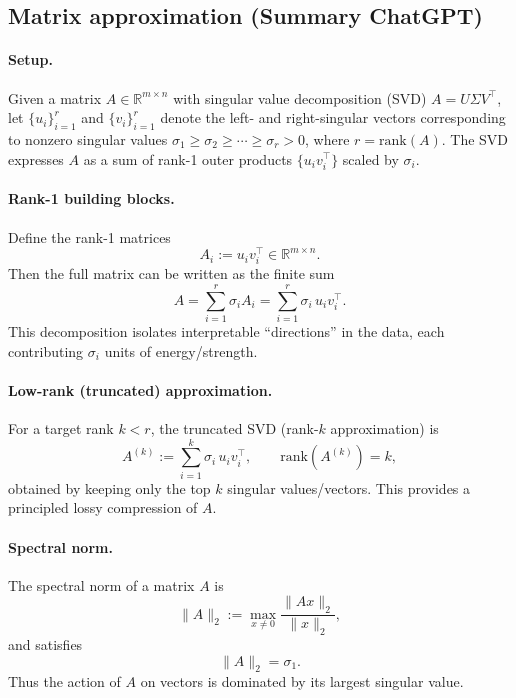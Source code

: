 \subsection{Matrix approximation (Summary ChatGPT)}

\paragraph{Setup.}
Given a matrix \(A \in \mathbb{R}^{m\times n}\) with singular value decomposition (SVD)
\(A = U\Sigma V^\top\),
let \(\{u_i\}_{i=1}^r\) and \(\{v_i\}_{i=1}^r\) denote the left- and right-singular vectors
corresponding to nonzero singular values \(\sigma_1 \ge \sigma_2 \ge \cdots \ge \sigma_r>0\),
where \(r=\mathrm{rank}(A)\). The SVD expresses \(A\) as a sum of rank-1 outer products \(\{u_iv_i^\top\}\) scaled by \(\sigma_i\). %

\paragraph{Rank-1 building blocks.}
Define the rank-1 matrices
\[
A_i := u_i v_i^\top \in \mathbb{R}^{m\times n}.
\]
Then the full matrix can be written as the finite sum
\[
A = \sum_{i=1}^r \sigma_i A_i
= \sum_{i=1}^r \sigma_i\, u_i v_i^\top.
\]
This decomposition isolates interpretable ``directions'' in the data, each contributing
\(\sigma_i\) units of energy/strength. %

\paragraph{Low-rank (truncated) approximation.}
For a target rank \(k<r\),
the truncated SVD (rank-\(k\) approximation) is
\[
A^{(k)} := \sum_{i=1}^k \sigma_i\, u_i v_i^\top,
\qquad \mathrm{rank}\!\left(A^{(k)}\right)=k,
\]
obtained by keeping only the top \(k\) singular values/vectors. This provides
a principled lossy compression of \(A\). %

\paragraph{Spectral norm.}
The spectral norm of a matrix \(A\) is
\[
\|A\|_2 := \max_{x\neq 0} \frac{\|Ax\|_2}{\|x\|_2},
\]
and satisfies
\[
\|A\|_2 = \sigma_1.
\]
Thus the action of \(A\) on vectors is dominated by its largest singular value. %

